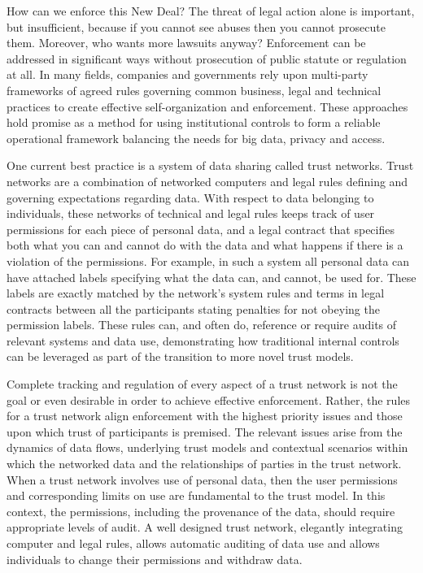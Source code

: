 How can we enforce this New Deal?
The threat of legal action alone is important, but insufficient, because if you cannot see abuses then you cannot prosecute them.
Moreover, who wants more lawsuits anyway?
Enforcement can be addressed in significant ways without prosecution of public statute or regulation at all.
In many fields, companies and governments rely upon multi-party frameworks of agreed rules governing common business, legal and technical practices to create effective self-organization and enforcement.
These approaches hold promise as a method for using institutional controls to form a reliable operational framework balancing the needs for big data, privacy and access.

One current best practice is a system of data sharing called trust networks.
Trust networks are a combination of networked computers and legal rules defining and governing expectations regarding data.
With respect to data belonging to individuals, these networks of technical and legal rules keeps track of user permissions for each piece of personal data, and a legal contract that specifies both what you can and cannot do with the data and what happens if there is a violation of the permissions.
For example, in such a system all personal data can have attached labels specifying what the data can, and cannot, be used for.
These labels are exactly matched by the network's system rules and terms in legal contracts between all the participants stating penalties for not obeying the permission labels.
These rules can, and often do, reference or require audits of relevant systems and data use, demonstrating how traditional internal controls can be leveraged as part of the transition to more novel trust models.

Complete tracking and regulation of every aspect of a trust network is not the goal or even desirable in order to achieve effective enforcement.
Rather, the rules for a trust network align enforcement with the highest priority issues and those upon which trust of participants is premised.
The relevant issues arise from the dynamics of data flows, underlying trust models and contextual scenarios within which the networked data and the relationships of parties in the trust network. 
When a trust network involves use of personal data, then the user permissions and corresponding limits on use are fundamental to the trust model.
In this context, the permissions, including the provenance of the data, should require appropriate levels of audit.
A well designed trust network, elegantly integrating computer and legal rules, allows automatic auditing of data use and allows individuals to change their permissions and withdraw data.

